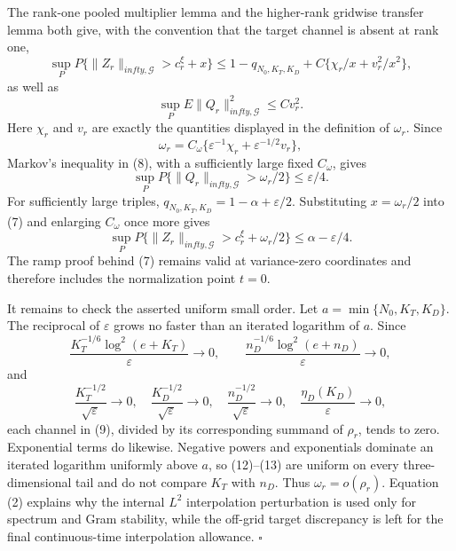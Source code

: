 The rank-one pooled multiplier lemma and the higher-rank gridwise transfer
lemma both give, with the convention that the target channel is absent at
rank one,
\[
 \sup_PP\{\|Z_r\|_{infty,\mathcal G}>c_r^\xi+x\}
 \le1-q_{N_0,K_T,K_D}+C\{\chi_r/x+v_r^2/x^2\},            \tag{7}
\]
as well as
\[
 \sup_PE\|Q_r\|_{infty,\mathcal G}^2\le Cv_r^2.          \tag{8}
\]
Here \(\chi_r\) and \(v_r\) are exactly the quantities displayed in the
definition of \(\omega_r\).  Since
\[
 \omega_r=C_\omega\{\varepsilon^{-1}\chi_r
                    +\varepsilon^{-1/2}v_r\},              \tag{9}
\]
Markov's inequality in (8), with a sufficiently large fixed \(C_\omega\),
gives
\[
 \sup_PP\{\|Q_r\|_{infty,\mathcal G}>\omega_r/2\}
 \le\varepsilon/4.                                         \tag{10}
\]
For sufficiently large triples,
\(q_{N_0,K_T,K_D}=1-\alpha+\varepsilon/2\).  Substituting
\(x=\omega_r/2\) into (7) and enlarging \(C_\omega\) once more gives
\[
 \sup_PP\{\|Z_r\|_{infty,\mathcal G}>c_r^\xi+\omega_r/2\}
 \le\alpha-\varepsilon/4.                                 \tag{11}
\]
The ramp proof behind (7) remains valid at variance-zero coordinates and
therefore includes the normalization point \(t=0\).

It remains to check the asserted uniform small order.  Let
\(a=\min\{N_0,K_T,K_D\}\).  The reciprocal of \(\varepsilon\) grows no
faster than an iterated logarithm of \(a\).  Since
\[
 \frac{K_T^{-1/6}\log^2(e+K_T)}{\varepsilon}\to0,
 \qquad
 \frac{n_D^{-1/6}\log^2(e+n_D)}{\varepsilon}\to0,         \tag{12}
\]
and
\[
 \frac{K_T^{-1/2}}{\sqrt\varepsilon}\to0,
 \quad
 \frac{K_D^{-1/2}}{\sqrt\varepsilon}\to0,
 \quad
 \frac{n_D^{-1/2}}{\sqrt\varepsilon}\to0,
 \quad
 \frac{\eta_D(K_D)}{\varepsilon}\to0,                    \tag{13}
\]
each channel in (9), divided by its corresponding summand of \(\rho_r\),
tends to zero.  Exponential terms do likewise.  Negative powers and
exponentials dominate an iterated logarithm uniformly above \(a\), so
(12)--(13) are uniform on every three-dimensional tail and do not compare
\(K_T\) with \(n_D\).  Thus \(\omega_r=o(\rho_r)\).  Equation (2) explains
why the internal \(L^2\) interpolation perturbation is used only for
spectrum and Gram stability, while the off-grid target discrepancy is left
for the final continuous-time interpolation allowance. \(\square\)